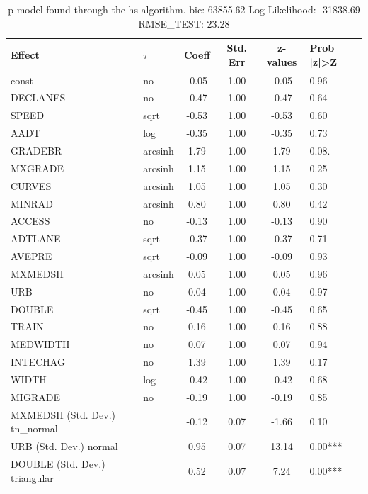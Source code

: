 \begin{table}
	\caption{p model found through the hs algorithm. bic: 63855.62 Log-Likelihood: -31838.69 RMSE_TEST: 23.28}
	\begin{center}
		\begin{tabular}{|l|l|c|c|c|l|}
			\hline
			Effect & $\tau$ & Coeff & Std. Err & z-values & Prob |z|>Z \\
			\hline
			const & no & -0.05 & 1.00 & -0.05 & 0.96 \\
			\hline
			DECLANES & no & -0.47 & 1.00 & -0.47 & 0.64 \\
			\hline
			SPEED & sqrt & -0.53 & 1.00 & -0.53 & 0.60 \\
			\hline
			AADT & log & -0.35 & 1.00 & -0.35 & 0.73 \\
			\hline
			GRADEBR & arcsinh & 1.79 & 1.00 & 1.79 & 0.08. \\
			\hline
			MXGRADE & arcsinh & 1.15 & 1.00 & 1.15 & 0.25 \\
			\hline
			CURVES & arcsinh & 1.05 & 1.00 & 1.05 & 0.30 \\
			\hline
			MINRAD & arcsinh & 0.80 & 1.00 & 0.80 & 0.42 \\
			\hline
			ACCESS & no & -0.13 & 1.00 & -0.13 & 0.90 \\
			\hline
			ADTLANE & sqrt & -0.37 & 1.00 & -0.37 & 0.71 \\
			\hline
			AVEPRE & sqrt & -0.09 & 1.00 & -0.09 & 0.93 \\
			\hline
			MXMEDSH & arcsinh & 0.05 & 1.00 & 0.05 & 0.96 \\
			\hline
			URB & no & 0.04 & 1.00 & 0.04 & 0.97 \\
			\hline
			DOUBLE & sqrt & -0.45 & 1.00 & -0.45 & 0.65 \\
			\hline
			TRAIN & no & 0.16 & 1.00 & 0.16 & 0.88 \\
			\hline
			MEDWIDTH & no & 0.07 & 1.00 & 0.07 & 0.94 \\
			\hline
			INTECHAG & no & 1.39 & 1.00 & 1.39 & 0.17 \\
			\hline
			WIDTH & log & -0.42 & 1.00 & -0.42 & 0.68 \\
			\hline
			MIGRADE & no & -0.19 & 1.00 & -0.19 & 0.85 \\
			\hline
			MXMEDSH (Std. Dev.) tn_normal &  & -0.12 & 0.07 & -1.66 & 0.10 \\
			\hline
			URB (Std. Dev.) normal &  & 0.95 & 0.07 & 13.14 & 0.00*** \\
			\hline
			DOUBLE (Std. Dev.) triangular &  & 0.52 & 0.07 & 7.24 & 0.00*** \\

\end{tabular}
\end{center}
\end{table}

